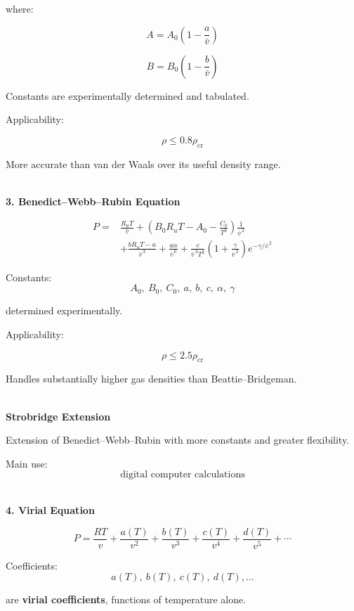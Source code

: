 \documentclass[12pt]{article}
\begin{document}
where:

\[
\boxed{
A=A_0\left(1-\frac{a}{\bar v}\right)
}
\]

\[
\boxed{
B=B_0\left(1-\frac{b}{\bar v}\right)
}
\]

Constants are experimentally determined and tabulated.

Applicability:

\[
\boxed{
\rho\leq0.8\rho_{\mathrm{cr}}
}
\]

More accurate than van der Waals over its useful density range.

\textbf{\\ 3. Benedict--Webb--Rubin Equation}

\[
\boxed{
\begin{aligned}
P={}&
\frac{R_uT}{\bar v}
+
\left(
B_0R_uT-A_0-\frac{C_0}{T^2}
\right)\frac{1}{\bar v^{\,2}}
\\
&+
\frac{bR_uT-a}{\bar v^{\,3}}
+
\frac{a\alpha}{\bar v^{\,6}}
+
\frac{c}{\bar v^{\,3}T^2}
\left(
1+\frac{\gamma}{\bar v^{\,2}}
\right)
e^{-\gamma/\bar v^{\,2}}
\end{aligned}
}
\]

Constants:
\[
\boxed{
A_0,\ B_0,\ C_0,\ a,\ b,\ c,\ \alpha,\ \gamma
}
\]

determined experimentally.

Applicability:

\[
\boxed{
\rho\leq2.5\rho_{\mathrm{cr}}
}
\]

Handles substantially higher gas densities than Beattie--Bridgeman.

\textbf{\\ Strobridge Extension}

Extension of Benedict--Webb--Rubin with more constants and greater flexibility.

Main use:
\[
\boxed{\text{digital computer calculations}}
\]

\textbf{\\ 4. Virial Equation}

\[
\boxed{
P=
\frac{RT}{v}
+
\frac{a(T)}{v^2}
+
\frac{b(T)}{v^3}
+
\frac{c(T)}{v^4}
+
\frac{d(T)}{v^5}
+\cdots
}
\]

Coefficients:
\[
\boxed{
a(T),\ b(T),\ c(T),\ d(T),\ldots
}
\]

are \textbf{virial coefficients}, functions of temperature alone.
\end{document}
